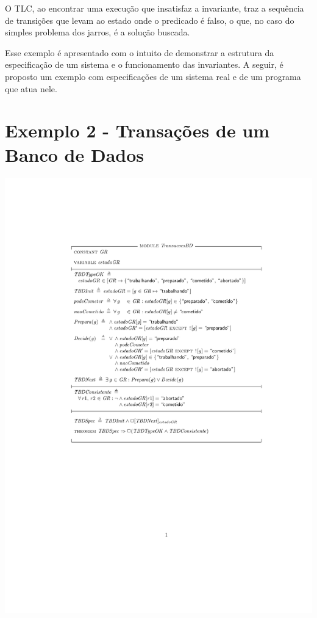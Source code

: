 O TLC, ao encontrar uma execução que insatisfaz a invariante, traz a sequência de transições que levam ao estado onde o predicado é falso, o que, no caso do simples problema dos jarros, é a solução buscada.

Esse exemplo é apresentado com o intuito de demonstrar a estrutura da especificação de um sistema e o funcionamento das invariantes. A seguir, é proposto um exemplo com especificações de um sistema real e de um programa que atua nele.

\section{Exemplo 2 - Transações de um Banco de Dados}

\hspace*{-1.2in}
\vspace*{-1in}
\includegraphics{TransacoesBD.pdf}
